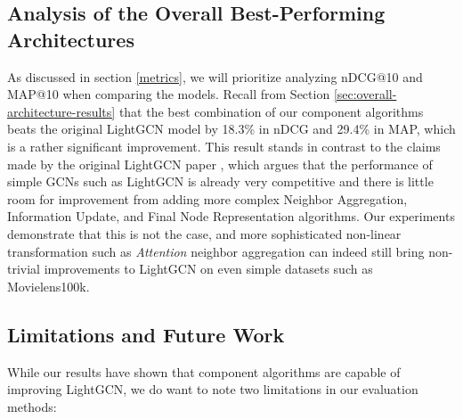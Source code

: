 \documentclass{article}
\begin{document}
\subsection{Analysis of the Overall Best-Performing Architectures} \label{sec:analysis_overall}

As discussed in section \ref{metrics}, we will prioritize analyzing nDCG@10 and MAP@10 when comparing the models. Recall from Section \ref{sec:overall-architecture-results} that the best combination of our component algorithms beats the original LightGCN model by 18.3\% in nDCG and 29.4\% in MAP, which is a rather significant improvement. This result stands in contrast to the claims made by the original LightGCN paper \cite{lightgcn}, which argues that the performance of simple GCNs such as LightGCN is already very competitive and there is little room for improvement from adding more complex Neighbor Aggregation, Information Update, and Final Node Representation algorithms. Our experiments demonstrate that this is not the case, and more sophisticated non-linear transformation such as \textit{Attention} neighbor aggregation can indeed still bring non-trivial improvements to LightGCN on even simple datasets such as Movielens100k.

\subsection{Limitations and Future Work}

While our results have shown that component algorithms are capable of improving LightGCN, we do want to note two limitations in our evaluation methods:
\end{document}
